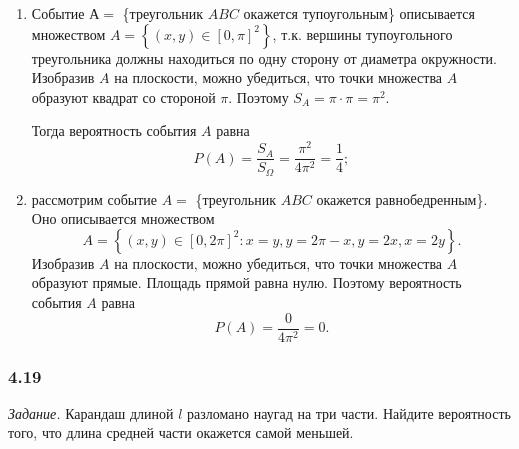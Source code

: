 \begin{enumerate}[label=\alph*)]
\item Событие $А = $ \{треугольник $ABC$ окажется тупоугольным\} описывается множеством
$A =
\left\{ \left( x, y \right) \in \left[0, \pi \right]^2 \right\}$,
т.к. вершины тупоугольного треугольника должны находиться по одну сторону от диаметра окружности.
Изобразив $A$ на плоскости, можно убедиться, что точки множества $A$ образуют квадрат со стороной $ \pi $.
Поэтому $S_A = \pi \cdot \pi = \pi^2$.

Тогда вероятность события $A$ равна
$$P \left( A \right) =
\frac{S_A}{S_{ \Omega }} =
\frac{ \pi^2}{4 \pi^2} =
\frac{1}{4};$$

\item рассмотрим событие $A = $ \{треугольник $ABC$ окажется равнобедренным\}.
Оно описывается множеством 
$$A = \left\{ \left( x, y \right) \in \left[0, 2 \pi \right]^2: x = y, y = 2 \pi - x, y = 2x, x = 2y \right\}.$$
Изобразив $A$ на плоскости, можно убедиться, что точки множества $A$ образуют прямые.
Площадь прямой равна нулю.
Поэтому вероятность события $A$ равна
$$P \left( A \right) =
\frac{0}{4 \pi^2} =
0.$$
\end{enumerate}

\subsubsection*{4.19}

\textit{Задание.} Карандаш длиной $l$ разломано наугад на три части.
Найдите вероятность того, что длина средней части окажется самой меньшей.

